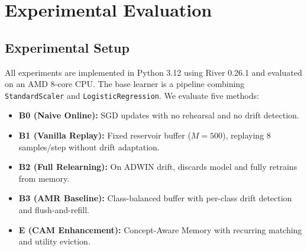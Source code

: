 \documentclass[conference]{IEEEtran}
\begin{document}
\section{Experimental Evaluation}

\subsection{Experimental Setup}
All experiments are implemented in Python 3.12 using River 0.26.1 and evaluated on an AMD 8-core CPU. The base learner is a pipeline combining \texttt{StandardScaler} and \texttt{LogisticRegression}. We evaluate five methods:
\begin{itemize}
    \item \textbf{B0 (Naive Online):} SGD updates with no rehearsal and no drift detection.
    \item \textbf{B1 (Vanilla Replay):} Fixed reservoir buffer ($M=500$), replaying 8 samples/step without drift adaptation.
    \item \textbf{B2 (Full Relearning):} On ADWIN drift, discards model and fully retrains from memory.
    \item \textbf{B3 (AMR Baseline):} Class-balanced buffer with per-class drift detection and flush-and-refill.
    \item \textbf{E (CAM Enhancement):} Concept-Aware Memory with recurring matching and utility eviction.
\end{itemize}
\end{document}
